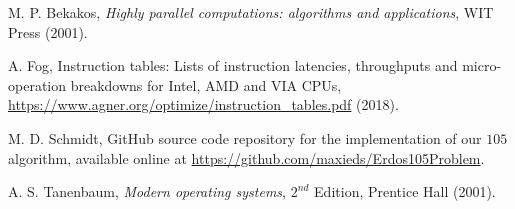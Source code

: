 \documentclass[12pt]{article}
\begin{document}
\begin{thebibliography}{10} 

M. P. Bekakos, \emph{Highly parallel computations: algorithms and applications}, WIT Press (2001). 

A. Fog, Instruction tables: Lists of instruction latencies, throughputs and micro-operation breakdowns for Intel, AMD and VIA CPUs, \url{https://www.agner.org/optimize/instruction_tables.pdf} (2018). 

M. D. Schmidt, GitHub source code repository for the implementation of our $105$ algorithm, 
  available online at \url{https://github.com/maxieds/Erdos105Problem}. 
  
A. S. Tanenbaum, \emph{Modern operating systems}, $2^{nd}$ Edition, Prentice Hall (2001). 





\end{thebibliography} 
\end{document}
